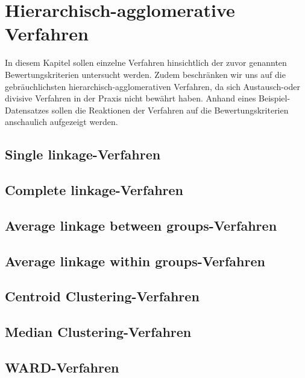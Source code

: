 \chapter{Hierarchisch-agglomerative Verfahren}

In diesem Kapitel sollen einzelne Verfahren hinsichtlich der zuvor genannten Bewertungskriterien untersucht werden. Zudem beschränken wir uns auf die gebräuchlichsten hierarchisch-agglomerativen Verfahren, da sich Austausch-oder divisive Verfahren in der Praxis nicht bewährt haben. Anhand eines Beispiel-Datensatzes sollen die Reaktionen der Verfahren auf die Bewertungskriterien anschaulich aufgezeigt werden.

\section{Single linkage-Verfahren}
\section{Complete linkage-Verfahren}
\section{Average linkage between groups-Verfahren}
\section{Average linkage within groups-Verfahren}
\section{Centroid Clustering-Verfahren}
\section{Median Clustering-Verfahren}
\section{WARD-Verfahren}